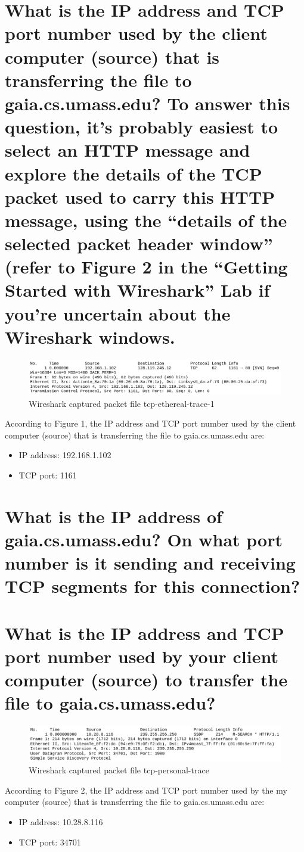 \documentclass[12pt,a4paper]{article}
\begin{document}
\newpage

\section{What is the IP address and TCP port number used by the client computer (source) that is transferring the file to \\ gaia.cs.umass.edu? To answer this question, it’s probably easiest to select an HTTP message and explore the details of the TCP packet used to carry this HTTP message, using the “details of the selected packet header window” (refer to Figure 2 in the “Getting Started with Wireshark” Lab if you’re uncertain about the Wireshark windows.}

\begin{figure}[h]
    \centering
    \includegraphics[width=\linewidth]{imgs/Figure1.png}
    \caption{Wireshark captured packet file tcp-ethereal-trace-1}
    \label{fig:tcp-ethereal-trace-1}
\end{figure}

According to Figure 1, the IP address and TCP port number used by the client computer (source) that is transferring the file to gaia.cs.umass.edu are:

\begin{itemize}
    \item IP address: 192.168.1.102
    \item TCP port: 1161
\end{itemize}

\section{What is the IP address of gaia.cs.umass.edu? On what port number is it sending and receiving TCP segments for this connection?}



\section{What is the IP address and TCP port number used by your client computer (source) to transfer the file to gaia.cs.umass.edu?}

\begin{figure}[h]
    \centering
    \includegraphics[width=\linewidth]{imgs/Figure2.png}
    \caption{Wireshark captured packet file tcp-personal-trace}
    \label{fig:tcp-personal-trace}
\end{figure}

According to Figure 2, the IP address and TCP port number used by the my computer (source) that is transferring the file to gaia.cs.umass.edu are:

\begin{itemize}
    \item IP address: 10.28.8.116
    \item TCP port: 34701
\end{itemize}
\end{document}
